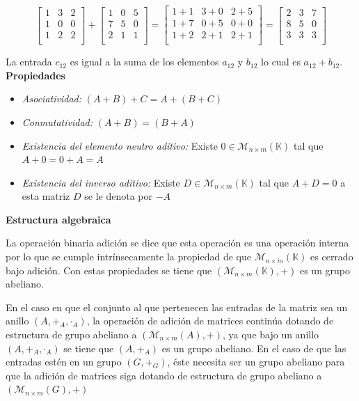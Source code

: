 $$
\begin{bmatrix}
1 & 3 & 2 \\
1 & 0 & 0 \\
1 & 2 & 2 \\
\end{bmatrix}
+
\begin{bmatrix}
1 & 0 & 5 \\
7 & 5 & 0 \\
2 & 1 & 1 \\
\end{bmatrix}
=
\begin{bmatrix}
1+1 & 3+0 & 2+5 \\
1+7 & 0+5 & 0+0 \\
1+2 & 2+1 & 2+1 \\
\end{bmatrix}
=
\begin{bmatrix}
2 & 3 & 7 \\
8 & 5 & 0 \\
3 & 3 & 3 \\
\end{bmatrix}
$$

La entrada $c_{12}$ es igual a la suma de los elementos $a_{12}$ y $b_{12}$ lo cual es $a_{12} + b_{12}$. \\

\noindent\textbf{Propiedades}

\begin{itemize}
\item \textit{Asociatividad:} $( A + B) + C = A + (B + C)$
\item \textit{Conmutatividad:} $(A + B) = (B + A)$
\item \textit{Existencia del elemento neutro aditivo:} Existe $0\in \mathcal{M}_{n\times {m}}(\mathbb{K})$ tal que $A + 0 = 0 + A = A$
\item \textit{Existencia del inverso aditivo:} Existe $D\in \mathcal{M}_{n\times {m}}(\mathbb{K})$ tal que $A + D = 0$ a esta matriz $D$ se le denota por $-A$
\end{itemize}

\noindent\textbf{Estructura algebraica}

La operación binaria adición se dice que esta operación es una operación interna por lo que se cumple intrínsecamente la propiedad de que $\mathcal{M}_{n\times {m}}(\mathbb{K})$ es cerrado bajo adición. Con estas propiedades se tiene que $(\mathcal{M}_{n\times {m}}(\mathbb{K}), + )$ es un grupo abeliano.

En el caso en que el conjunto al que pertenecen las entradas de la matriz sea un anillo $(A, +_A, \cdot{_A})$, la operación de adición de matrices continúa dotando de estructura de grupo abeliano a $(\mathcal{M}_{n\times {m}}(A), +)$, ya que bajo un anillo $(A, +_A, \cdot{_A})$ se tiene que $(A, +_A)$ es un grupo abeliano. En el caso de que las entradas estén en un grupo $(G, +_G)$, éste necesita ser un grupo abeliano para que la adición de matrices siga dotando de estructura de grupo abeliano a $(\mathcal{M}_{n\times {m}}(G), +)$ \\


